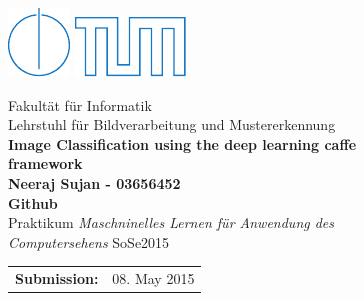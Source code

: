 \begin{figure}[!h]

  \includegraphics{pics/IN.pdf} \hfill \includegraphics{pics/tumlogo.pdf}
 
  \vspace*{1cm}
  {\large \textsf{Fakult{\"a}t f{\"u}r Informatik}}\\
  {\large \textsf{Lehrstuhl f{\"u}r Bildverarbeitung und Mustererkennung}}\\
 

  \vspace*{5cm}
%
%
%
%
  {\color{tumblue} \Huge \bf \textsf{Image Classification using the deep learning caffe framework}}\\  %

  \vspace*{1cm}
%
%
%
% 
  {\Large \bf \textsf{Neeraj Sujan - 03656452}}\\   
  {\Large \bf \textsf{Github }}\\               %
 
  \vspace*{8cm}
  {\Large \textsf{Praktikum \emph{Maschninelles Lernen f{\"u}r Anwendung des Computersehens} SoSe2015}}\\
 
  \vspace*{1cm} 
  \begin{tabular}{ll}
%
%
%
%


%
%
%
%
    {\Large \bf \textsf{Submission:}} &
    {\Large \textsf{08. May 2015}}

  \end{tabular}
  
\end{figure}

